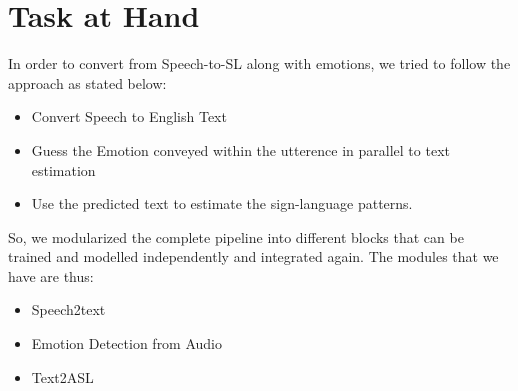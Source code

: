 \documentclass[14pt,a4paper]{article}
\begin{document}
\section{Task at Hand}
In order to convert from Speech-to-SL along with emotions, we tried to follow the approach as stated below:
\begin{itemize}
	\item Convert Speech to English Text
	\item Guess the Emotion conveyed within the utterence in parallel to text estimation
	\item Use the predicted text to estimate the sign-language patterns.
\end{itemize}
So, we modularized the complete pipeline into different blocks that can be trained and modelled independently and integrated again. The modules that we have are thus:
\begin{itemize}
	\item Speech2text
	\item Emotion Detection from Audio
	\item Text2ASL
\end{itemize}
\end{document}
